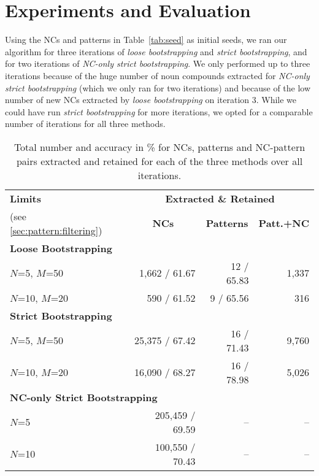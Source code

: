 \documentclass[letterpaper,11pt]{article}
\newcommand{\tabref}[2][]{Table#1~\ref{#2}\xspace}
\begin{document}
\section{Experiments and Evaluation}
\label{sec:experiment}

Using  the  NCs and patterns in  \tabref{tab:seed}   as  initial  seeds,  we  ran
our  algorithm  for  three iterations  of  \emph{loose  bootstrapping}
and   \emph{strict  bootstrapping},   and   for   two  iterations   of
\emph{NC-only strict bootstrapping}. We only performed up to three iterations
because of the huge number of noun compounds extracted
for \emph{NC-only strict bootstrapping} (which we only ran for two iterations)
and because of the low number of new NCs extracted by \emph{loose bootstrapping} on iteration 3.
While we could have run \emph{strict bootstrapping} for more iterations,
we opted for a comparable number of iterations for all three methods.


\begin{table}[bth]
\begin{center}
\footnotesize
\begin{tabular}{|l|rrr|}
\hline
\textbf{Limits} & \multicolumn{3}{c|}{\bf Extracted \& Retained} \\
(see \ref{sec:pattern:filtering}) & \multicolumn{1}{c}{\bf NCs} & \multicolumn{1}{c}{\bf Patterns } & \multicolumn{1}{c|}{\bf Patt.+NC}\\
\hline
\multicolumn{4}{l}{\textbf{Loose Bootstrapping}}\\
\hline
$N$=5, $M$=50 & 1,662 / 61.67 & 12 / 65.83 & 1,337 \\
$N$=10, $M$=20 &   590 / 61.52 & 9 / 65.56 & 316 \\
\hline
\multicolumn{4}{l}{\textbf{Strict Bootstrapping}}\\
\hline
$N$=5, $M$=50 & 25,375 / 67.42 & 16 / 71.43 & 9,760 \\
$N$=10, $M$=20 & 16,090 / 68.27 & 16 / 78.98 & 5,026\\
\hline
\multicolumn{4}{l}{\textbf{NC-only Strict Bootstrapping}}\\
\hline
$N$=5  & 205,459 / 69.59 & -- & -- \\
$N$=10 & 100,550 / 70.43 & -- & -- \\
\hline
\end{tabular}
\caption{\label{tab:extracted:count}
Total number and accuracy in \%
for NCs, patterns and NC-pattern pairs extracted and retained
for each of the three methods over all iterations.
}
\end{center}
\end{table}
\end{document}
